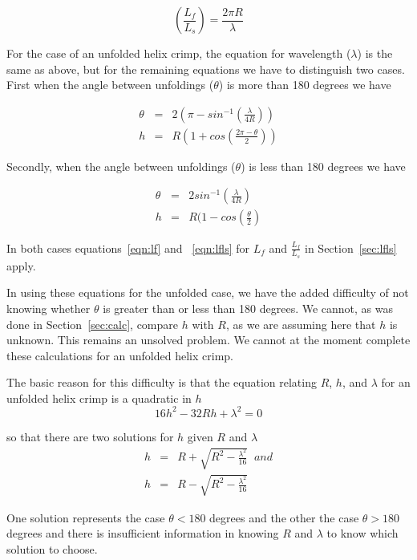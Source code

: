 \documentclass[titlepage,10pt]{article}  %
\begin{document}
\begin{equation}
\left(\frac{L_{f}}{L_{s}} \right)  =  \frac{2\pi R}{\lambda}
\end{equation}

For the case of an unfolded helix crimp, the  equation for wavelength ($\lambda$) is the same as above, but for the remaining equations we have to distinguish two cases. First when the angle between unfoldings ($\theta$) is more than 180 degrees we have

\begin{eqnarray}
\theta & = & 2(\pi - sin^{-1}\left(\frac{\lambda}{4R}\right) ) \\
h & = & R(1 + cos\left(\frac{2\pi - \theta}{2}\right)) 
\end{eqnarray}

Secondly, when the angle between unfoldings ($\theta$) is less than 180 degrees we have

\begin{eqnarray}
\theta & = & 2 sin^{-1}\left(\frac{\lambda}{4R}\right) \\
h & = & R(1 - cos\left(\frac{\theta}{2}\right) 
\end{eqnarray}

In both cases  equations~\ref{eqn:lf} and ~\ref{eqn:lfls} for $L_{f}$ and $\frac{L_{f}}{L_{s}}$ in Section~\ref{sec:lfls} apply.

In using these equations for the unfolded case,  we have the added difficulty of not knowing whether $\theta$ is greater than or less than 180 degrees. We cannot, as was done in Section~\ref{sec:calc}, compare $h$ with $R$, as we are assuming here that $h$ is unknown. This remains an unsolved problem.  We cannot at the moment complete these calculations for an unfolded helix crimp.

The basic reason for this difficulty is that the equation relating $R$, $h$, and $\lambda$ for an unfolded helix crimp is a quadratic in $h$
\begin{displaymath}
16 h^{2} - 32 R h + \lambda^{2} = 0
\end{displaymath}

so that there are two solutions for $h$ given $R$ and $\lambda$
\begin{eqnarray*}
h & = & R + \sqrt{R^{2} - \frac{\lambda^{2}}{16}} \; \; and \\
h & = & R - \sqrt{R^{2} - \frac{\lambda^{2}}{16}}
\end{eqnarray*}

One solution represents the case $\theta<180$ degrees and the other the case $\theta>180$ degrees and there is insufficient information in knowing $R$ and $\lambda$ to know which solution to choose. 
\end{document}

